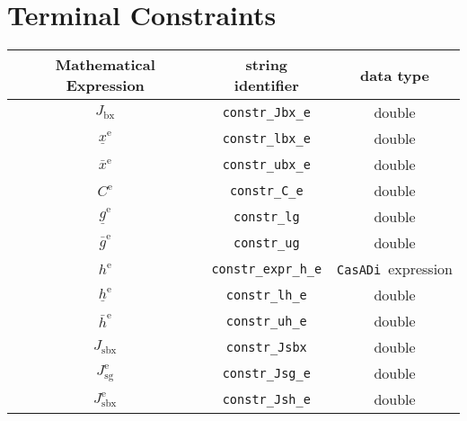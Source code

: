 \documentclass{article}
\newcommand{\code}[1]{\texttt{#1}}
\newcommand{\casadi}{\texttt{CasADi}}
\newcommand{\ind}[1]{_{\textrm{#1}}}
\newcommand{\terminal}{^{\textrm{e}}}
\begin{document}
\section{Terminal Constraints}
\begin{table}[h]
	\centering
	\begin{tabular}{|c|c|c|}
		\toprule
		Mathematical Expression                    & string identifier & data type \\ \midrule
		$J_{\textrm{bx}}$ & \code{constr\_Jbx\_e}    & double    \\
		$\underline{x}\terminal $    & \code{constr\_lbx\_e}     & double    \\
		$\bar{x}\terminal $         & \code{constr\_ubx\_e}     & double   \\ \midrule
		$ C\terminal $ & \code{constr\_C\_e}    & double    \\
		$\underline{g}\terminal $    & \code{constr\_lg}     & double    \\
		$\bar{g}\terminal $         & \code{constr\_ug}     & double   \\ \midrule
		$ h\terminal $ & \code{constr\_expr\_h\_e}    & \casadi~expression   \\
		$\underline{h}\terminal $    & \code{constr\_lh\_e}     & double    \\
		$\bar{h}\terminal $         & \code{constr\_uh\_e}     & double   \\ \midrule
		$ J\ind{sbx} $ & \code{constr\_Jsbx} & double \\
		$ J\ind{sg}\terminal $ & \code{constr\_Jsg\_e} & double \\
		$ J\ind{sbx}\terminal $ & \code{constr\_Jsh\_e} & double \\
		\bottomrule
	\end{tabular}
\end{table}
\end{document}

